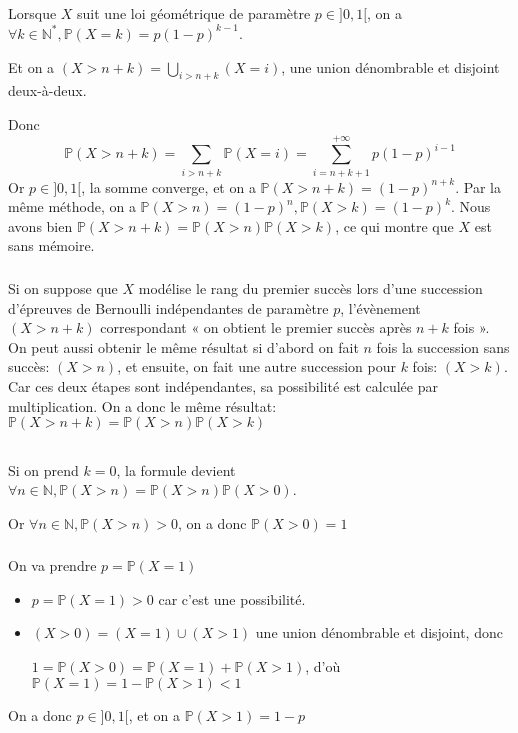 \documentclass[a4paper,12pt]{book}
\begin{document}
\subsection{}
\subsubsection{}
Lorsque $X$ suit une loi géométrique de paramètre $p \in ]0,1[$, 
on a $\forall k \in \mathbb{N}^{*}, \mathbb{P}(X=k)=p(1-p)^{k-1}$. 

Et on a $(X>n+k)=\bigcup_{i>n+k}(X=i)$, une union dénombrable et disjoint deux-à-deux.

Donc 
$$
\mathbb{P}(X>n+k)=\sum_{i>n+k}\mathbb{P}(X=i)=\sum_{i=n+k+1}^{+\infty}p(1-p)^{i-1}
$$
Or $p \in ]0,1[$, la somme converge, et on a $\mathbb{P}(X>n+k)=(1-p)^{n+k}$. 
Par la même méthode, on a $\mathbb{P}(X>n)=(1-p)^{n}, \mathbb{P}(X>k)=(1-p)^{k}$. 
Nous avons bien $\mathbb{P}(X>n+k)=\mathbb{P}(X>n)\mathbb{P}(X>k)$, ce qui montre que $X$ est sans mémoire.
\subsubsection{}
Si on suppose que $X$ modélise le rang du premier succès lors d’une succession d’épreuves de Bernoulli
indépendantes de paramètre $p$, l'évènement $(X>n+k)$ correspondant « on obtient le premier succès après $n+k$ fois ». 
On peut aussi obtenir le même résultat si d'abord on fait $n$ fois la succession sans succès: $(X>n)$, et ensuite, on 
fait une autre succession pour $k$ fois: $(X>k)$. Car ces deux étapes sont indépendantes, sa possibilité est calculée par 
multiplication. On a donc le même résultat: $\boxed{\mathbb{P}(X>n+k)=\mathbb{P}(X>n)\mathbb{P}(X>k)}$

\subsection{}
\subsubsection{}
Si on prend $k=0$, la formule devient $\forall n \in \mathbb{N}, \mathbb{P}(X>n)=\mathbb{P}(X>n)\mathbb{P}(X>0)$. 

Or $\forall n \in \mathbb{N}, \mathbb{P}(X>n)>0$, on a donc $\boxed{\mathbb{P}(X>0)=1}$
\subsubsection{}
On va prendre $p=\mathbb{P}(X=1)$
\begin{itemize}
    \item $p=\mathbb{P}(X=1)>0$ car c'est une possibilité.
    \item $(X>0)=(X=1) \cup (X>1)$ une union dénombrable et disjoint, donc 
          
          $1=\mathbb{P}(X>0)=\mathbb{P}(X=1)+\mathbb{P}(X>1)$, d'où $\mathbb{P}(X=1)=1-\mathbb{P}(X>1)<1$
\end{itemize}
On a donc $p \in ]0,1[$, et on a $\mathbb{P}(X>1)=1-p$
\end{document}
